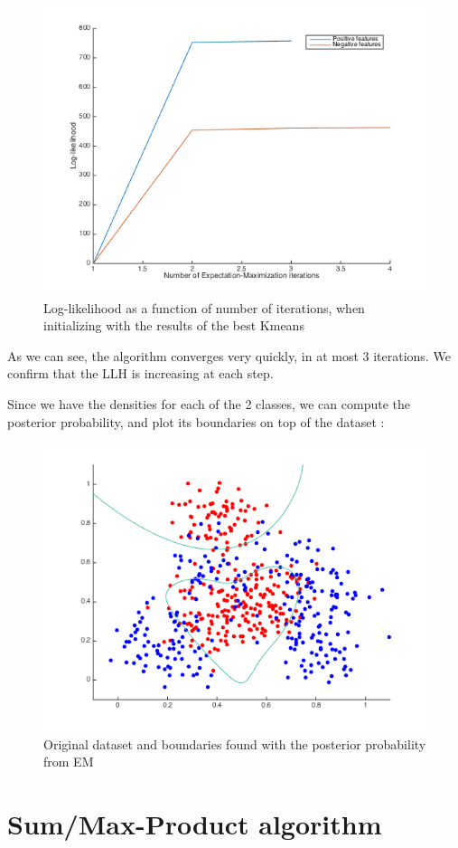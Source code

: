 \documentclass[a4paper, 12pt]{article}
\begin{document}
\begin{figure}[H]
	\centering
	\noindent\includegraphics[scale=0.6]{llh.png}
	\caption{Log-likelihood as a function of number of iterations, when initializing with the results of the best Kmeans}
\end{figure}
As we can see, the algorithm converges very quickly, in at most 3 iterations. We confirm that the LLH is increasing at each step.

Since we have the densities for each of the 2 classes, we can compute the posterior probability, and plot its boundaries on top of the dataset :
\begin{figure}[H]
	\centering
	\noindent\includegraphics[scale=0.6]{boundaries.png}
	\caption{Original dataset and boundaries found with the posterior probability from EM}
\end{figure}

\section{Sum/Max-Product algorithm}
\end{document}
